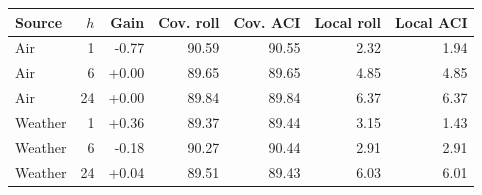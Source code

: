 \begin{tabular}{lrrrrrr}
\toprule
Source & $h$ & Gain & Cov. roll & Cov. ACI & Local roll & Local ACI \\
\midrule
Air & 1 & -0.77 & 90.59 & 90.55 & 2.32 & 1.94 \\
Air & 6 & +0.00 & 89.65 & 89.65 & 4.85 & 4.85 \\
Air & 24 & +0.00 & 89.84 & 89.84 & 6.37 & 6.37 \\
Weather & 1 & +0.36 & 89.37 & 89.44 & 3.15 & 1.43 \\
Weather & 6 & -0.18 & 90.27 & 90.44 & 2.91 & 2.91 \\
Weather & 24 & +0.04 & 89.51 & 89.43 & 6.03 & 6.01 \\
\bottomrule
\end{tabular}
